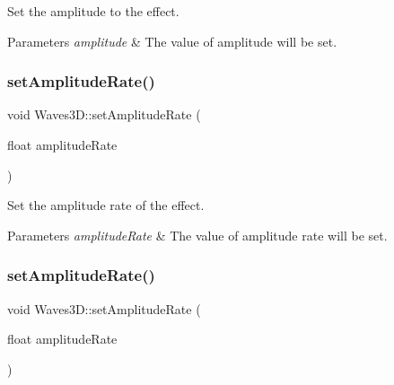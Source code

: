 Set the amplitude to the effect. 


\begin{DoxyParams}{Parameters}
{\em amplitude} & The value of amplitude will be set. \\
\hline
\end{DoxyParams}
\mbox{\label{classWaves3D_a9ab0956b09066554cf41f0bd38749495}} 
\subsubsection{\texorpdfstring{set\+Amplitude\+Rate()}{setAmplitudeRate()}\hspace{0.1cm}{\footnotesize\ttfamily [1/2]}}
{\footnotesize\ttfamily void Waves3\+D\+::set\+Amplitude\+Rate (\begin{DoxyParamCaption}\item[{float}]{amplitude\+Rate }\end{DoxyParamCaption})\hspace{0.3cm}{\ttfamily [inline]}}



Set the amplitude rate of the effect. 


\begin{DoxyParams}{Parameters}
{\em amplitude\+Rate} & The value of amplitude rate will be set. \\
\hline
\end{DoxyParams}
\mbox{\label{classWaves3D_a9ab0956b09066554cf41f0bd38749495}} 
\subsubsection{\texorpdfstring{set\+Amplitude\+Rate()}{setAmplitudeRate()}\hspace{0.1cm}{\footnotesize\ttfamily [2/2]}}
{\footnotesize\ttfamily void Waves3\+D\+::set\+Amplitude\+Rate (\begin{DoxyParamCaption}\item[{float}]{amplitude\+Rate }\end{DoxyParamCaption})\hspace{0.3cm}{\ttfamily [inline]}}



